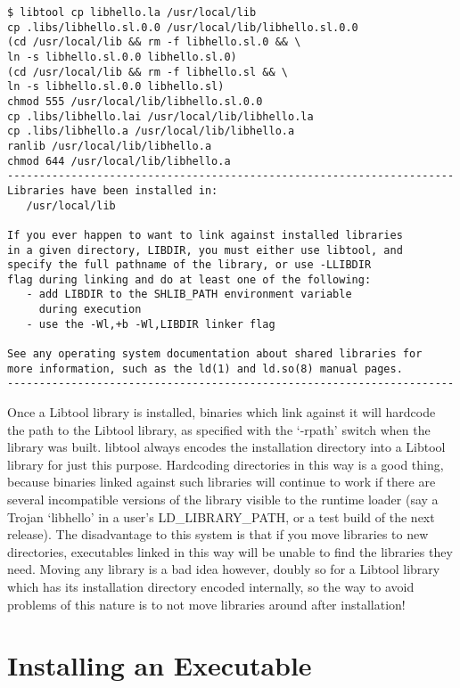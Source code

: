\begin{Verbatim}
$ libtool cp libhello.la /usr/local/lib
cp .libs/libhello.sl.0.0 /usr/local/lib/libhello.sl.0.0
(cd /usr/local/lib && rm -f libhello.sl.0 && \
ln -s libhello.sl.0.0 libhello.sl.0)
(cd /usr/local/lib && rm -f libhello.sl && \
ln -s libhello.sl.0.0 libhello.sl)
chmod 555 /usr/local/lib/libhello.sl.0.0
cp .libs/libhello.lai /usr/local/lib/libhello.la
cp .libs/libhello.a /usr/local/lib/libhello.a
ranlib /usr/local/lib/libhello.a
chmod 644 /usr/local/lib/libhello.a
----------------------------------------------------------------------
Libraries have been installed in:
   /usr/local/lib

If you ever happen to want to link against installed libraries
in a given directory, LIBDIR, you must either use libtool, and
specify the full pathname of the library, or use -LLIBDIR
flag during linking and do at least one of the following:
   - add LIBDIR to the SHLIB_PATH environment variable
     during execution
   - use the -Wl,+b -Wl,LIBDIR linker flag

See any operating system documentation about shared libraries for
more information, such as the ld(1) and ld.so(8) manual pages.
----------------------------------------------------------------------
\end{Verbatim}

 Once a Libtool library is installed, binaries which link against it will hardcode the path to the Libtool library, as specified with the `-rpath' switch when the library was built. libtool always encodes the installation directory into a Libtool library for just this purpose. Hardcoding directories in this way is a good thing, because binaries linked against such libraries will continue to work if there are several incompatible versions of the library visible to the runtime loader (say a Trojan `libhello' in a user's LD\_{}LIBRARY\_{}PATH, or a test build of the next release). The disadvantage to this system is that if you move libraries to new directories, executables linked in this way will be unable to find the libraries they need. Moving any library is a bad idea however, doubly so for a Libtool library which has its installation directory encoded internally, so the way to avoid problems of this nature is to not move libraries around after installation! 

\section{Installing an Executable}

